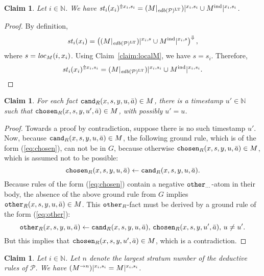 \documentclass{tlp}
\newtheorem{claim}[theorem]{Claim}
\newcommand{\Nat}{\mathbb{N}}  \newcommand{\len}[1]{|#1|} \newcommand{\rom}[1]{\text{\emph{(#1)}}} \newcommand{\romI}{\rom i}
\newcommand{\ded}{\mathcal{P}}
\newcommand{\proj}[2]{#1|_{#2}}
\newcommand{\edb}[1]{\fname{edb}(#1)}
\newcommand{\sh}[1]{(#1)}
\newcommand{\toloct}[1]{#1^{\mathrm{LT}}}
\newcommand{\addlt}[3]{#1^{\Uparrow#2,#3}}
\newcommand{\projlt}[3]{#1|^{#2,#3}}
\newcommand{\shprojlt}[3]{\projlt{\sh{#1}}{#2}{#3}}
\newcommand{\droplt}[1]{#1^{\Downarrow}}
\newcommand{\chosen}{\pred{chosen}}
\newcommand{\other}{\pred{other}}
\newcommand{\cand}{\pred{cand}}
\newcommand{\cnfs}{\mathit{st}}
\newcommand{\grded}{G}
\newcommand{\locM}[1]{\fname{loc}_{M}(#1)}
\begin{document}
\begin{appendix}
\begin{claim}\label{claim:state-is-edb-ind}Let $i\in\Nat$. We have
$\addlt{\cnfs_{i}(x_{i})}{x_{i}}{s_{i}}=\shprojlt{\proj M{\toloct{\edb{\ded}}}}{x_{i}}{s_{i}}\cup\projlt{\ind M}{x_{i}}{s_{i}}$.\end{claim}

\begin{proof}By definition, 
\[
\cnfs_{i}(x_{i})=\droplt{\left(\shprojlt{\proj M{\toloct{\edb{\ded}}}}{x_{i}}s\cup\projlt{\ind M}{x_{i}}s\right)},
\]
where $s=\locM{i,x_{i}}$. Using Claim~\ref{claim:localM}, we have
$s=s_{i}$. Therefore, 
\[
\addlt{\cnfs_{i}(x_{i})}{x_{i}}{s_{i}}=\shprojlt{\proj M{\toloct{\edb{\ded}}}}{x_{i}}{s_{i}}\cup\projlt{\ind M}{x_{i}}{s_{i}}.
\]
\end{proof}



\tline



\begin{claim}\label{claim:cand-implies-chosen}For each fact $\cand_{R}(x,s,y,u,\bar{a})\in M$,
there is a timestamp $u'\in\Nat$ such that $\chosen_{R}(x,s,y,u',\bar{a})\in M$,
with possibly $u'=u$.\end{claim}

\begin{proof}Towards a proof by contradiction, suppose there is no
such timestamp $u'$. Now, because $\cand_{R}(x,s,y,u,\bar{a})\in M$,
the following ground rule, which is of the form (\ref{eq:chosen}),
can not be in $\grded$, because otherwise $\chosen_{R}(x,s,y,u,\bar{a})\in M$,
which is assumed not to be possible:
\[
\chosen_{R}(x,s,y,u,\bar{a})\gets\cand_{R}(x,s,y,u,\bar{a}).
\]
Because rules of the form (\ref{eq:chosen}) contain a negative $\other_{\ldots}$-atom
in their body, the absence of the above ground rule from $\grded$
implies $\other_{R}(x,s,y,u,\bar{a})\in M$. This $\other_{R}$-fact
must be derived by a ground rule of the form (\ref{eq:other}):
\[
\other_{R}(x,s,y,u,\bar{a})\gets\cand_{R}(x,s,y,u,\bar{a}),\,\chosen_{R}(x,s,y,u',\bar{a}),\, u\neq u'.
\]
But this implies that $\chosen_{R}(x,s,y,u',\bar{a})\in M$, which
is a contradiction. \end{proof}



\tline



\begin{claim}\label{claim:M-largest-stratum}Let $i\in\Nat$. Let
$n$ denote the largest stratum number of the deductive rules of $\ded$.
We have $\shprojlt{\strat Mn}{x_{i}}{s_{i}}=\projlt M{x_{i}}{s_{i}}$.\end{claim}


\end{appendix}
\end{document}
